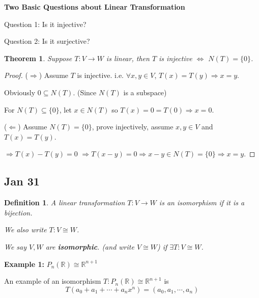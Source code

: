 \documentclass[12pt]{article}
\newtheorem{theorem}{Theorem}[subsection]
\newtheorem{definition}{Definition}[subsection]
\newcommand{\mR}{{\mathbb{R}}}
\begin{document}
	{\color{brown}
	\textbf{Two Basic Questions about Linear Transformation}
	
	Question 1: Is it injective? 

	Question 2: Is it surjective? 
	}
	\begin{theorem}
		Suppose $T : V\to W$ is linear, then $T$ is injective $\iff$ 
		$N(T) = \{0\}$.  
	\end{theorem}
	\begin{proof}
		($\Rightarrow$) Assume $T$ is injective. i.e. $\forall x,y \in V$, 
		$T(x) = T(y) \Rightarrow x=y$. 

		Obviously $0 \subseteq N(T)$. (Since $N(T)$ is a subspace)
		
		For $N(T) \subseteq \{0\}$, let $x \in N(T)$ so $T(x) = 0 = T(0)
		\Rightarrow x=0$. 


		($\Leftarrow$) Assume $N(T) = \{0\}$, prove injectively, 
		assume $x, y \in V$ and $T(x) = T(y)$.

		$\Rightarrow T(x) - T(y) = 0$ $\Rightarrow T(x-y) = 0 \Rightarrow
		x-y \in N(T) = \{0\} \Rightarrow x=y$. 
	\end{proof}

	
\newpage
	\subsection{Jan 31}
	\begin{definition}
		A linear transformation $T : V\to W$ is an isomorphism if it is a 
		bijection. 

		We also write $T:V\cong W$. 

		We say $V, W$ are \textbf{isomorphic}. (and write $V\cong W$) if 
		$\exists T: V\cong W$. 
	\end{definition}

	{\color{Brown}
		\textbf{Example 1: }
		$P_n(\mR) \cong \mR^{n+1}$ 

		An example of an isomorphism 
		$T:P_n(\mR) \cong \mR^{n+1}$ is 
		\[
			T(a_0+a_1+\cdots+a_nx^n) = (a_0, a_1, \cdots, a_n)
		\]
	}
\end{document}
